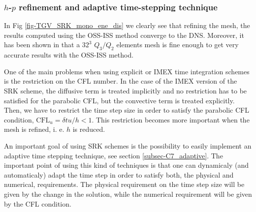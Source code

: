 
\subsubsection{$h$-$p$ refinement and adaptive time-stepping technique}
\label{subsubsec-C7_TGV_hp_refinement}
In Fig \ref{fig-TGV_SRK_mono_ene_dis} we clearly see that refining the mesh, the results computed using the OSS-ISS method converge to the DNS. Moreover, it has been shown in  that a $ 32^3 $ $ Q_3/Q_2 $ elements mesh is fine enough to get very accurate results with the OSS-ISS method.

One of the main problems when using explicit or IMEX time integration schemes is the restriction on the CFL number. In the case of the IMEX version of the SRK scheme, the diffusive term is treated implicitly and no restriction has to be satisfied for the parabolic CFL, but the convective term is treated explicitly. Then, we have to restrict the time step size in order to satisfy the parabolic CFL condition, $ \mbox{CFL}_u=\delta tu/h<1 $. This restriction becomes more important when the mesh is refined, i. e. $ h $ is reduced.

An important goal of using SRK schemes is the possibility to easily implement an adaptive time stepping technique, see section \ref{subsec-C7_adaptive}. The important point of using this kind of techniques is that one can dynamicaly (and automaticaly) adapt the time step in order to satisfy both, the physical and numerical, requirements. The physical requirement on the time step size will be given by the change in the solution, while the numerical requirement will be given by the CFL condition.


